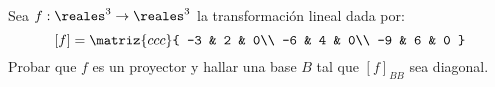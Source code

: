 \begin{enunciado}{\ejercicio}
  Sea $f: \reales^3 \to \reales^3$ la transformación lineal dada por:
  $$
    [f] =
    \matriz{ccc}{
      -3 & 2 & 0\\
      -6 & 4 & 0\\
      -9 & 6 & 0
    }
  $$
    Probar que $f$ es un proyector y hallar una base $B$ tal que $[f]_{BB}$ sea diagonal.
\end{enunciado}

\hacer
